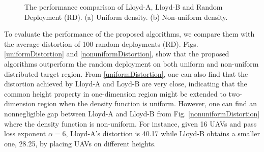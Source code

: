 \documentclass[smallabstract,smallcaptions]{dccpaper}
\begin{document}
\begin{figure}[!htb]
\setlength\abovecaptionskip{0pt}
\setlength\belowcaptionskip{0pt}
\centering
{}
\hfil
{}
\captionsetup{justification=justified}
\caption{\small{The performance comparison of Lloyd-A, Lloyd-B and Random Deployment (RD). 
(a) Uniform density. (b) Non-uniform density.}}
\label{Distortion}
\end{figure}

To evaluate the performance of the proposed algorithms, we compare them with the average distortion of 100 random
deployments (RD).  Figs. \ref{uniformDistortion} and \ref{nonuniformDistortion}, show that the proposed algorithms
outperform the random deployment on both uniform and non-uniform distributed target region.  From
\ref{uniformDistortion}, one can also find that the distortion achieved by Lloyd-A and Loyd-B are very close, indicating
that the common height property in one-dimension region might be extended to two-dimension region when the density
function is uniform.  However, one can find an nonnegligible gap between Lloyd-A and Lloyd-B from Fig.
\ref{nonuniformDistortion} where the density function is non-uniform. For instance, given 16 UAVs and pass loss exponent
$\alpha=6$, Lloyd-A's distortion is 40.17 while Lloyd-B obtains a smaller one, 28.25, by placing UAVs on different
heights.
\end{document}
